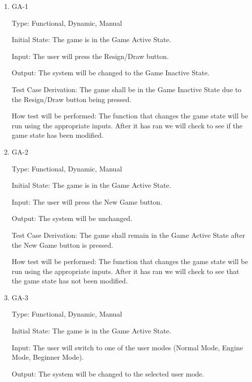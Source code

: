 \documentclass[12pt, titlepage]{article}
\begin{document}
  \begin{enumerate}
  
  \item{GA-1\\}
  
  Type: Functional, Dynamic, Manual
                      
  Initial State: The game is in the Game Active State.
                      
  Input: The user will press the Resign/Draw button.
                      
  Output: The system will be changed to the Game Inactive State.
                      
  Test Case Derivation: The game shall be in the Game Inactive State due to the Resign/Draw button being pressed.
  
  How test will be performed: The function that changes the game state will be run using the appropriate inputs.
  After it has ran we will check to see if the game state has been modified.
  
  \item{GA-2\\}
  
  Type: Functional, Dynamic, Manual
                      
  Initial State: The game is in the Game Active State.
                      
  Input: The user will press the New Game button.
                      
  Output: The system will be unchanged.
                      
  Test Case Derivation: The game shall remain in the Game Active State after the New Game button is pressed.
  
  How test will be performed: The function that changes the game state will be run using the appropriate inputs.
  After it has ran we will check to see that the game state has not been modified.
  
  \item{GA-3\\}
  
  Type: Functional, Dynamic, Manual
                      
  Initial State: The game is in the Game Active State.
                      
  Input: The user will switch to one of the user modes (Normal Mode, Engine Mode, Beginner Mode).
  
  Output: The system will be changed to the selected user mode.
                      

\end{enumerate}
\end{document}

